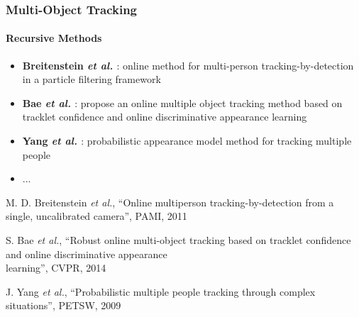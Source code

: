 \begin{frame}
	\frametitle{Multi-Object Tracking}
	\framesubtitle{Recursive Methods}
	
	\Large
	
	\vspace{0.05cm}
	
	\begin{itemize}
		\item \textbf{Breitenstein \emph{et al.} \cite{Breitenstein11}}: online method for
			  multi-person tracking-by-detection in a particle filtering framework
		\item \textbf{Bae \emph{et al.} \cite{Bae14}}: propose an online multiple object
			  tracking method based on tracklet confidence and online discriminative appearance learning
		\item \textbf{Yang \emph{et al.} \cite{Yang09}}: probabilistic appearance model
			  method for tracking multiple people
		\item ...
	\end{itemize}
	
	\vspace{0.15cm}
	
	\tiny
	
	\cite{Breitenstein11} M. D. Breitenstein \emph{et al.}, ``Online multiperson tracking-by-detection
	from a single, uncalibrated camera'', PAMI, 2011
	
	\vspace{0.05cm}
	
	\cite{Bae14} S. Bae \emph{et al.}, ``Robust online multi-object tracking based on tracklet
	confidence and online discriminative appearance\\ \hspace{0.25cm} learning'', CVPR, 2014
	
	\vspace{-0.19cm}
	
	\cite{Yang09} J. Yang \emph{et al.}, ``Probabilistic multiple people tracking through complex
	situations'', PETSW, 2009
\end{frame}

